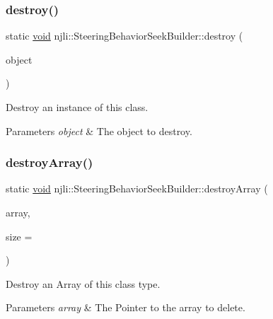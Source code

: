 \subsubsection{\texorpdfstring{destroy()}{destroy()}}
{\footnotesize\ttfamily static \mbox{\hyperlink{_thread_8h_af1e856da2e658414cb2456cb6f7ebc66}{void}} njli\+::\+Steering\+Behavior\+Seek\+Builder\+::destroy (\begin{DoxyParamCaption}\item[{\mbox{\hyperlink{classnjli_1_1_steering_behavior_seek_builder}{Steering\+Behavior\+Seek\+Builder}} $\ast$}]{object }\end{DoxyParamCaption})\hspace{0.3cm}{\ttfamily [static]}}

Destroy an instance of this class.


\begin{DoxyParams}{Parameters}
{\em object} & The object to destroy. \\
\hline
\end{DoxyParams}
\mbox{\label{classnjli_1_1_steering_behavior_seek_builder_a79ba169b4b13e84e880349e0a3508355}} 
\subsubsection{\texorpdfstring{destroy\+Array()}{destroyArray()}}
{\footnotesize\ttfamily static \mbox{\hyperlink{_thread_8h_af1e856da2e658414cb2456cb6f7ebc66}{void}} njli\+::\+Steering\+Behavior\+Seek\+Builder\+::destroy\+Array (\begin{DoxyParamCaption}\item[{\mbox{\hyperlink{classnjli_1_1_steering_behavior_seek_builder}{Steering\+Behavior\+Seek\+Builder}} $\ast$$\ast$}]{array,  }\item[{const \mbox{\hyperlink{_util_8h_a10e94b422ef0c20dcdec20d31a1f5049}{u32}}}]{size = {} }\end{DoxyParamCaption})\hspace{0.3cm}{\ttfamily [static]}}

Destroy an Array of this class type.


\begin{DoxyParams}{Parameters}
{\em array} & The Pointer to the array to delete. \\
\hline
\end{DoxyParams}
\mbox{\label{classnjli_1_1_steering_behavior_seek_builder_aef230103bd57064629e51d1375c27e68}} 
